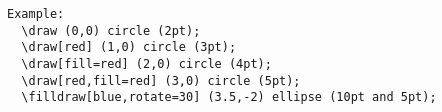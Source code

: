 \documentclass[a4paper,12pt]{article}
\begin{document}
\begin{verbatim}
Example:
  \draw (0,0) circle (2pt);
  \draw[red] (1,0) circle (3pt);
  \draw[fill=red] (2,0) circle (4pt);
  \draw[red,fill=red] (3,0) circle (5pt);
  \filldraw[blue,rotate=30] (3.5,-2) ellipse (10pt and 5pt);
\end{verbatim}

\end{document}
